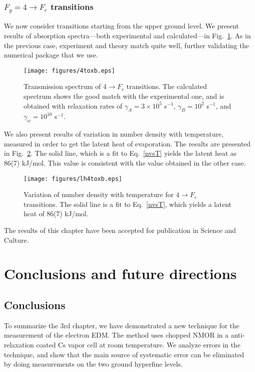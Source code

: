 	\subsection{$ F_g = 4 \rightarrow F_e $ transitions}
	
	We now consider transitions starting from the upper ground level. We present results of absorption spectra---both experimental and calculated---in Fig.~\ref{4tox}. As in the previous case, experiment and theory match quite well, further validating the numerical package that we use.
	
	\begin{figure}[h]
		\centering
		\texttt{[image: figures/4toxb.eps]}
		\caption{Transmission spectrum of $ 4 \rightarrow F_e $ transitions. The calculated spectrum shows the good match with the experimental one, and is obtained with relaxation rates of  $ \gamma_A = 3 \times 10^5 $ s$^{-1}$, $ \gamma_B = 10^2 $ s$^{-1}$, and $ \gamma_w = 10^{10} $ s$^{-1}$.}
		\label{4tox}
	\end{figure}
	
	We also present results of variation in number density with temperature, measured in order to get the latent heat of evaporation. The results are presented in Fig.~\ref{lh4tox}. The solid line, which is a fit to Eq.~\eqref{nvsT} yields the latent heat as 86(7) kJ/mol. This value is consistent with the value obtained in the other case.
	
	\begin{figure}[h]
		\centering
		\texttt{[image: figures/lh4toxb.eps]}
		\caption{Variation of number density with temperature for $ 4 \rightarrow F_e $ transitions. The solid line is a fit to Eq.~\eqref{nvsT}, which yields a latent heat of 86(7) kJ/mol.}
		\label{lh4tox}
	\end{figure}
\clearpage
The results of this chapter have been accepted for publication in Science and Culture.

\chapter{Conclusions and future directions}	
	
\section{Conclusions}

To summarize the 3rd chapter,  we have demonstrated a new technique for the measurement of the electron EDM. The method uses chopped NMOR in a anti-relaxation coated Cs vapor cell at room temperature. We analyze errors in the technique, and show that the main source of systematic error can be eliminated by doing measurements on the two ground hyperfine levels.


